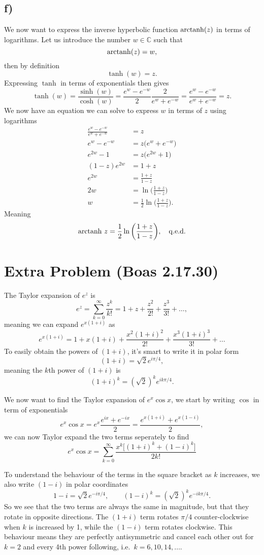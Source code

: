\documentclass[a4paper, 11pt, titlepage, english]{article}
\begin{document}
\subsection*{f)}
We now want to express the inverse hyperbolic function ${\rm arctanh}(z)$ in terms of logarithms. Let us introduce the number $w\in\mathbb{C}$ such that
$${\rm arctanh}(z) = w,$$
then by definition
$$\tanh(w) = z.$$
Expressing $\tanh$ in terms of exponentials then gives
$$\tanh(w) = \frac{\sinh(w)}{\cosh(w)} = \frac{e^w - e^{-w}}{2}\frac{2}{e^{w}+e^{-w}} = \frac{e^w - e^{-w}}{e^{w}+e^{-w}}=z.$$
We now have an equation we can solve to express $w$ in terms of $z$ using logarithms
\begin{align*}
\frac{e^w - e^{-w}}{e^{w}+e^{-w}} &= z \\
e^w - e^{-w} &= z\bigg(e^{w}+e^{-w}\bigg) \\
e^{2w} - 1 &= z\bigg(e^{2w}+1\bigg) \\
(1-z)e^{2w} &= 1 + z \\
e^{2w} &= \frac{1+z}{1-z} \\
2w &= \ln \bigg(\frac{1+z}{1-z}\bigg) \\
w &= \frac{1}{2}\ln \bigg(\frac{1+z}{1-z}\bigg).
\end{align*}
Meaning
$${\rm arctanh\ } z = \frac{1}{2}\ln \bigg(\frac{1+z}{1-z}\bigg),\quad {\rm q.e.d.}$$

\clearpage

\section*{Extra Problem (Boas 2.17.30)}

The Taylor expansion of $e^z$ is
$$e^z = \sum_{k=0}^\infty \frac{z^k}{k!} = 1 + z + \frac{z^2}{2!} + \frac{z^3}{3!} + \ldots,$$
meaning we can expand $e^{x(1+i)}$ as
$$e^{x(1+i)} = 1 + x(1+i) + \frac{x^2(1+i)^2}{2!} + \frac{x^3(1+i)^3}{3!} + \ldots$$
To easily obtain the powers of $(1+i)$, it's smart to write it in polar form
$$(1+i) = \sqrt{2}e^{i\pi/4},$$
meaning the $k$th power of $(1+i)$ is
$$(1+i)^k = (\sqrt{2})^k e^{ik\pi/4}.$$

We now want to find the Taylor expansion of $e^x\cos x$, we start by writing $\cos$ in term of exponentials
$$e^x\cos x = e^x \frac{e^{ix} + e^{-ix}}{2} = \frac{e^{x(1+i)} + e^{x(1-i)}}{2},$$
we can now Taylor expand the two terms seperately to find
$$e^x\cos x = \sum_{k=0}^\infty \frac{x^k\big[ (1+i)^k + (1-i)^k\big]}{2k!}$$

To understand the behaviour of the terms in the square bracket as $k$ increases, we also write $(1-i)$ in polar coordinates
$$1-i = \sqrt{2}e^{-i\pi/4}, \qquad (1-i)^k = (\sqrt{2})^k e^{-ik\pi/4}.$$
So we see that the two terms are always the same in magnitude, but that they rotate in opposite directions. The $(1+i)$ term rotates $\pi/4$ counter-clockwise when $k$ is increased by 1, while the $(1-i)$ term rotates clockwise. This behaviour means they are perfectly antisymmetric and cancel each other out for $k=2$ and every 4th power following, i.e.\ $k=6,10,14,\ldots$.
\end{document}
